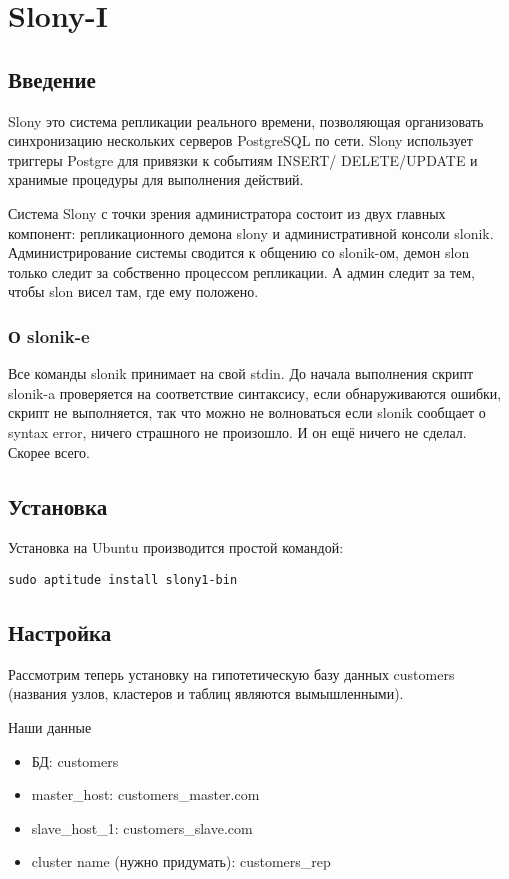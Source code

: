 \section{Slony-I}
\subsection{Введение}
Slony это система репликации реального времени, позволяющая организовать синхронизацию нескольких серверов
PostgreSQL по сети. Slony использует триггеры Postgre для привязки к событиям INSERT/ DELETE/UPDATE и
хранимые процедуры для выполнения действий.

Система Slony с точки зрения администратора состоит из двух главных компонент: репликационного демона slony и
административной консоли slonik. Администрирование системы сводится к общению со slonik-ом, демон slon только
следит за собственно процессом репликации. А админ следит за тем, чтобы slon висел там, где ему положено.

\subsubsection{О slonik-e}
Все команды slonik принимает на свой stdin. До начала выполнения скрипт slonik-a проверяется на соответствие синтаксису,
если обнаруживаются ошибки, скрипт не выполняется, так что можно не волноваться если slonik сообщает о syntax error,
ничего страшного не произошло. И он ещё ничего не сделал. Скорее всего.

\subsection{Установка}
Установка на Ubuntu производится простой командой:
\begin{lstlisting}[label=lst:slony1,caption=Установка]
sudo aptitude install slony1-bin
\end{lstlisting}

\subsection{Настройка}
\label{sec:slonyI}
Рассмотрим теперь установку на гипотетическую базу данных customers
(названия узлов, кластеров и таблиц являются вымышленными).

Наши данные
\begin{itemize}
\item БД: customers
\item master\_host: customers\_master.com
\item slave\_host\_1: customers\_slave.com
\item cluster name (нужно придумать): customers\_rep
\end{itemize}

